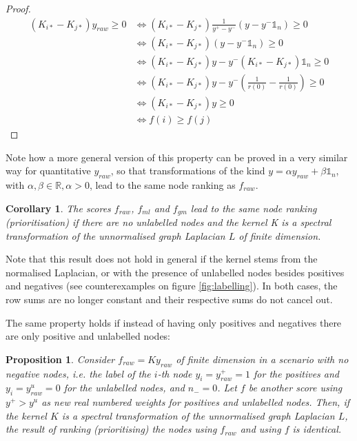 \documentclass[12pt]{article}  %
\newtheorem{corollary}[theorem]{Corollary}
\newtheorem{property}{Proposition}
\begin{document}
\begin{proof}
\begin{equation*}
\begin{split}
(K_{i*} - K_{j*}) y_{raw} \geq 0 &\Leftrightarrow (K_{i*} - K_{j*}) \frac{1}{y^{+} - y^{-}}(y - y^{-} \mathbb{1}_n) \geq 0 \\
&\Leftrightarrow (K_{i*} - K_{j*}) (y - y^{-} \mathbb{1}_n) \geq 0 \\
&\Leftrightarrow (K_{i*} - K_{j*}) y - y^{-}(K_{i*} - K_{j*}) \mathbb{1}_n \geq 0 \\
&\Leftrightarrow (K_{i*} - K_{j*}) y - y^{-}\left(\frac{1}{r(0)} - \frac{1}{r(0)}\right) \geq 0 \\
&\Leftrightarrow (K_{i*} - K_{j*}) y \geq 0 \\
&\Leftrightarrow f(i) \geq f(j) 
\end{split}
\end{equation*}

\end{proof}

Note how a more general version of this property can be proved in a very similar way for quantitative $y_{raw}$, so that transformations of the kind $y = \alpha y_{raw} + \beta \mathds{1}_n$, with $\alpha, \beta \in \mathds{R}, \alpha > 0$, lead to the same node ranking as $f_{raw}$. 

\begin{corollary}
The scores $f_{raw}$, $f_{ml}$ and $f_{gm}$ lead to the same node ranking (prioritisation) if there are no unlabelled nodes and the kernel K is a spectral transformation of the unnormalised graph Laplacian $L$ of finite dimension.
\end{corollary}

Note that this result does not hold in general if the kernel stems from the normalised Laplacian, or with the presence of unlabelled nodes besides positives and negatives (see counterexamples on figure \ref{fig:labelling}). 
In both cases, the row sums are no longer constant and their respective sums do not cancel out.

The same property holds if instead of having only positives and negatives there are only positive and unlabelled nodes:

\begin{property}

Consider $f_{raw} = K y_{raw}$ of finite dimension in a scenario with no negative nodes, i.e. the label of the $i$-th node $y_i = y_{raw}^+ = 1$ for the positives and $y_i = y_{raw}^u = 0$ for the unlabelled nodes, and $n_- = 0$.
Let $f$ be another score using $y^{+} > y^{u}$ as new real numbered weights for positives and unlabelled nodes.
Then, if the kernel $K$ is a spectral transformation of the unnormalised graph Laplacian $L$, the result of ranking (prioritising) the nodes using $f_{raw}$ and using $f$ is identical. 

\end{property}
\end{document}
